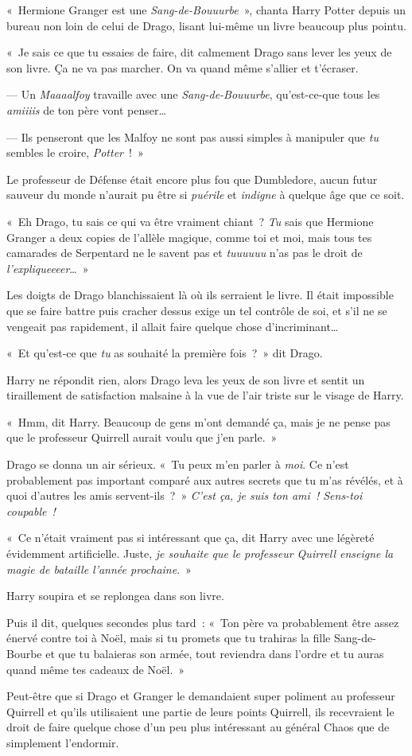 «~Hermione Granger est une \emph{Sang-de-Bouuurbe}~», chanta Harry Potter depuis un bureau non loin de celui de Drago, lisant lui-même un livre beaucoup plus pointu.

«~Je sais ce que tu essaies de faire, dit calmement Drago sans lever les yeux de son livre. Ça ne va pas marcher. On va quand même s'allier et t'écraser.

--- Un \emph{Maaaalfoy} travaille avec une \emph{Sang-de-Bouuurbe}, qu'est-ce-que tous les \emph{amiiiis} de ton père vont penser…

--- Ils penseront que les Malfoy ne sont pas aussi simples à manipuler que \emph{tu} sembles le croire, \emph{Potter}~!~»

Le professeur de Défense était encore plus fou que Dumbledore, aucun futur sauveur du monde n'aurait pu être si \emph{puérile} et \emph{indigne} à quelque âge que ce soit.

«~Eh Drago, tu sais ce qui va être vraiment chiant~? \emph{Tu} sais que Hermione Granger a deux copies de l'allèle magique, comme toi et moi, mais tous tes camarades de Serpentard ne le savent pas et \emph{tuuuuuu} n'as pas le droit de \emph{l'expliqueeeer}…~»

Les doigts de Drago blanchissaient là où ils serraient le livre. Il était impossible que se faire battre puis cracher dessus exige un tel contrôle de soi, et s'il ne se vengeait pas rapidement, il allait faire quelque chose d'incriminant…

«~Et qu'est-ce que \emph{tu} as souhaité la première fois~?~» dit Drago.

Harry ne répondit rien, alors Drago leva les yeux de son livre et sentit un tiraillement de satisfaction malsaine à la vue de l'air triste sur le visage de Harry.

«~Hmm, dit Harry. Beaucoup de gens m'ont demandé ça, mais je ne pense pas que le professeur Quirrell aurait voulu que j'en parle.~»

Drago se donna un air sérieux. «~Tu peux m'en parler à \emph{moi}. Ce n'est probablement pas important comparé aux autres secrets que tu m'as révélés, et à quoi d'autres les amis servent-ils~?~» \emph{C'est ça, je suis ton ami~! Sens-toi coupable~!}

«~Ce n'était vraiment pas si intéressant que ça, dit Harry avec une légèreté évidemment artificielle. Juste, \emph{je souhaite que le professeur Quirrell enseigne la magie de bataille l'année prochaine}.~»

Harry soupira et se replongea dans son livre.

Puis il dit, quelques secondes plus tard~: «~Ton père va probablement être assez énervé contre toi à Noël, mais si tu promets que tu trahiras la fille Sang-de-Bourbe et que tu balaieras son armée, tout reviendra dans l'ordre et tu auras quand même tes cadeaux de Noël.~»

Peut-être que si Drago et Granger le demandaient super poliment au professeur Quirrell et qu'ils utilisaient une partie de leurs points Quirrell, ils recevraient le droit de faire quelque chose d'un peu plus intéressant au général Chaos que de simplement l'endormir.~

